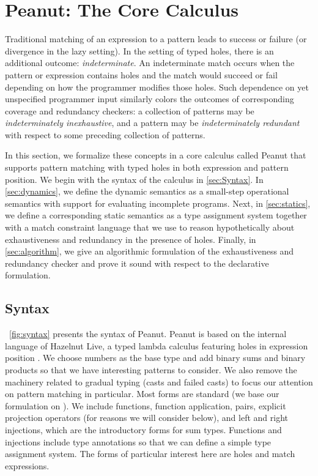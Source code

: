 \section{Peanut: The Core Calculus}
Traditional matching of an expression to a pattern leads to success or failure (or divergence in the lazy setting). In the setting of typed holes, there is an additional outcome: \emph{indeterminate}.
An indeterminate match occurs when the pattern or expression contains holes and the match would succeed or fail depending on how the programmer modifies those holes. Such dependence on yet unspecified programmer input similarly colors the outcomes of corresponding coverage and redundancy checkers: a collection of patterns may be \emph{indeterminately inexhaustive}, and a pattern may be \emph{indeterminately redundant} with respect to some preceding collection of patterns. 

In this section, we formalize these concepts in a core calculus called Peanut that supports pattern matching with typed holes in both expression and pattern position. 
We begin with the syntax of the calculus in \autoref{sec:Syntax}.
In \autoref{sec:dynamics}, we define the dynamic semantics as a small-step operational semantics with support for evaluating incomplete programs.
Next, in \autoref{sec:statics}, we define a corresponding static semantics as a type assignment system together with a match constraint language that we use to reason hypothetically about exhaustiveness and redundancy in the presence of
holes.
Finally, in \autoref{sec:algorithm}, we give an algorithmic formulation of the exhaustiveness and redundancy checker and prove it sound with respect to the declarative formulation.




\subsection{Syntax}
\label{sec:Syntax}
\figurename~\ref{fig:syntax} presents the syntax of Peanut.
Peanut is based on the internal language of Hazelnut Live, a typed lambda calculus featuring holes in expression position \cite{DBLP:journals/pacmpl/OmarVCH19}.
We choose numbers as the base type and add binary sums and binary products so that we have interesting
patterns to consider. We also remove the machinery related to gradual typing (casts and failed casts) to focus our attention on pattern matching in particular. Most forms are standard (we base our formulation on \cite{Harper2012}). We include functions, function application, pairs, explicit projection operators (for reasons we will consider below), and left and right injections, which are the introductory forms for sum types. Functions and injections include type annotations so that we can define a simple type assignment system. The forms of particular interest here are holes and match expressions.

